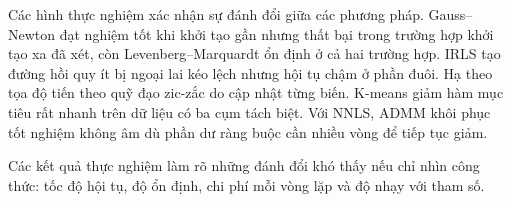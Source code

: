 Các hình thực nghiệm xác nhận sự đánh đổi giữa các phương pháp. Gauss--Newton đạt nghiệm tốt khi khởi tạo gần nhưng thất bại trong trường hợp khởi tạo xa đã xét, còn Levenberg--Marquardt ổn định ở cả hai trường hợp. IRLS tạo đường hồi quy ít bị ngoại lai kéo lệch nhưng hội tụ chậm ở phần đuôi. Hạ theo tọa độ tiến theo quỹ đạo zic-zắc do cập nhật từng biến. K-means giảm hàm mục tiêu rất nhanh trên dữ liệu có ba cụm tách biệt. Với NNLS, ADMM khôi phục tốt nghiệm không âm dù phần dư ràng buộc cần nhiều vòng để tiếp tục giảm.
\medskip

Các kết quả thực nghiệm làm rõ những đánh đổi khó thấy nếu chỉ nhìn công thức: tốc độ hội tụ, độ ổn định, chi phí mỗi vòng lặp và độ nhạy với tham số.
